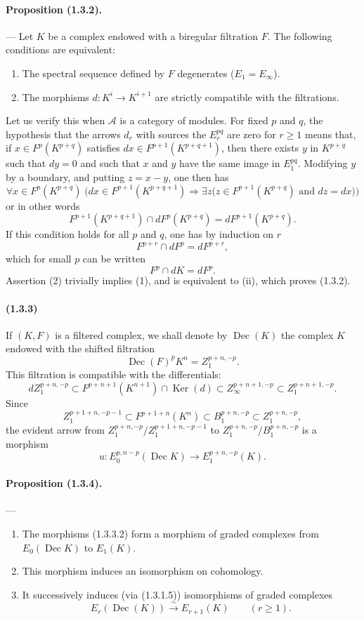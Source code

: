 \documentclass[10pt]{article}
\newcommand{\Ker}{\operatorname{Ker}}
\newcommand{\calA}{\mathcal A}
\newcommand{\iso}{\xrightarrow{\sim}}
\newcommand{\Dec}{\operatorname{Dec}}
\begin{document}
\paragraph{Proposition (1.3.2).} --- Let $K$ be a complex endowed with a biregular filtration $F$. The following conditions are equivalent:
\begin{enumerate}[label=(\roman*)]
\item The spectral sequence defined by $F$ degenerates ($E_1=E_\infty$).
\item The morphisms $d:K^i\to K^{i+1}$ are strictly compatible with the filtrations.
\end{enumerate}
Let us verify this when $\calA$ is a category of modules. For fixed $p$ and $q$, the hypothesis that the arrows $d_r$ with sources the $E_r^{pq}$ are zero for $r\geq 1$ means that, if $x\in F^p(K^{p+q})$ satisfies $dx\in F^{p+1}(K^{p+q+1})$, then there exists $y$ in $K^{p+q}$ such that $dy=0$ and such that $x$ and $y$ have the same image in $E_1^{pq}$. Modifying $y$ by a boundary, and putting $z=x-y$, one then has
\[
\forall x\in F^p(K^{p+q})\;\bigl(dx\in F^{p+1}(K^{p+q+1})\Rightarrow
\exists z\bigl(z\in F^{p+1}(K^{p+q})\text{ and }dz=dx\bigr)\bigr)
\]
or in other words
\[
\tag{1}
F^{p+1}(K^{p+q+1})\cap dF^p(K^{p+q})=dF^{p+1}(K^{p+q}).
\]
If this condition holds for all $p$ and $q$, one has by induction on $r$
\[
F^{p+r}\cap dF^p=dF^{p+r},
\]
which for small $p$ can be written
\[
\tag{2}
F^p\cap dK=dF^p.
\]
Assertion (2) trivially implies (1), and is equivalent to (ii), which proves (1.3.2).

\paragraph{(1.3.3)} If $(K,F)$ is a filtered complex, we shall denote by $\Dec(K)$ the complex $K$ endowed with the shifted filtration
\[
\Dec(F)^pK^n=Z_1^{p+n,-p}.
\]
This filtration is compatible with the differentials:
\[
dZ_1^{p+n,-p}\subset F^{p+n+1}(K^{n+1})\cap\Ker(d)
       \subset Z_\infty^{p+n+1,-p}\subset Z_1^{p+n+1,-p}.
\]
Since
\[
\tag{1.3.3.1}
Z_1^{p+1+n,-p-1}\subset F^{p+1+n}(K^n)\subset B_1^{p+n,-p}\subset Z_1^{p+n,-p},
\]
the evident arrow from $Z_1^{p+n,-p}/Z_1^{p+1+n,-p-1}$ to $Z_1^{p+n,-p}/B_1^{p+n,-p}$ is a morphism
\[
\tag{1.3.3.2}
u:E_0^{p,n-p}(\Dec K)\longrightarrow E_1^{p+n,-p}(K).
\]

\paragraph{Proposition (1.3.4).} ---
\begin{enumerate}[label=(\roman*)]
\item The morphisms (1.3.3.2) form a morphism of graded complexes from $E_0(\Dec K)$ to $E_1(K)$.
\item This morphism induces an isomorphism on cohomology.
\item It successively induces (via (1.3.1.5)) isomorphisms of graded complexes
\[
E_r(\Dec(K))\iso E_{r+1}(K)\qquad(r\ge1).
\]
\end{enumerate}
\end{document}
